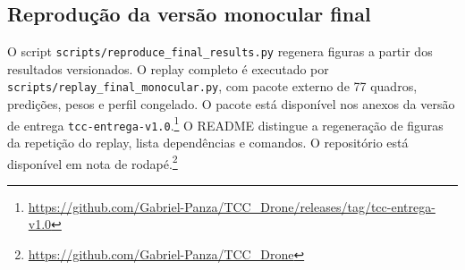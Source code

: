 \begin{apendicesenv}
\chapter{Reprodução da versão monocular final}
O script \texttt{scripts/reproduce\_final\_results.py} regenera figuras a partir dos resultados versionados. O replay completo é executado por \texttt{scripts/replay\_final\_monocular.py}, com pacote externo de 77 quadros, predições, pesos e perfil congelado. O pacote está disponível nos anexos da versão de entrega \texttt{tcc-entrega-v1.0}.\footnote{\url{https://github.com/Gabriel-Panza/TCC_Drone/releases/tag/tcc-entrega-v1.0}} O README distingue a regeneração de figuras da repetição do replay, lista dependências e comandos. O repositório está disponível em nota de rodapé.\footnote{\url{https://github.com/Gabriel-Panza/TCC_Drone}}

\end{apendicesenv}
